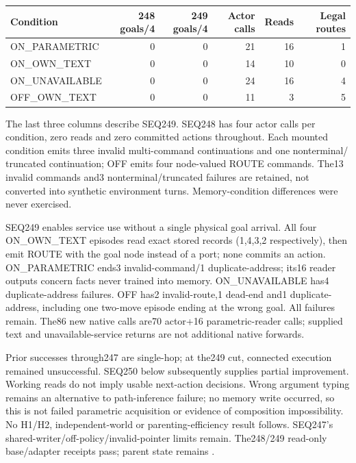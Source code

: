 \documentclass[11pt]{article}
\begin{document}
\begin{center}
\small
\begin{tabular}{lrrrrr}
\toprule
Condition & 248 goals/4 & 249 goals/4 & Actor calls & Reads & Legal routes \\
\midrule
ON\_PARAMETRIC & 0 & 0 & 21 & 16 & 1 \\
ON\_OWN\_TEXT & 0 & 0 & 14 & 10 & 0 \\
ON\_UNAVAILABLE & 0 & 0 & 24 & 16 & 4 \\
OFF\_OWN\_TEXT & 0 & 0 & 11 & 3 & 5 \\
\bottomrule
\end{tabular}
\end{center}
The last three columns describe SEQ249. SEQ248 has four actor calls per
condition, zero reads and zero committed actions throughout. Each mounted
condition emits three invalid multi-command continuations and one nonterminal/
truncated continuation; OFF emits four node-valued ROUTE commands. The13 invalid
commands and3 nonterminal/truncated failures are retained, not converted into
synthetic environment turns. Memory-condition differences were never exercised.

SEQ249 enables service use without a single physical goal arrival. All four
ON\_OWN\_TEXT episodes read exact stored records (1,4,3,2 respectively), then
emit ROUTE with the goal node instead of a port; none commits an action.
ON\_PARAMETRIC ends3 invalid-command/1 duplicate-address; its16 reader outputs
concern facts never trained into memory. ON\_UNAVAILABLE has4 duplicate-address
failures. OFF has2 invalid-route,1 dead-end and1 duplicate-address, including
one two-move episode ending at the wrong goal. All failures remain.
The86 new native calls are70 actor+16 parametric-reader calls; supplied text
and unavailable-service returns are not additional native forwards.

Prior successes through247 are single-hop; at the249 cut, connected execution
remained unsuccessful. SEQ250 below subsequently supplies partial improvement.
Working reads do not imply usable next-action decisions. Wrong argument typing
remains an alternative to path-inference failure; no memory write occurred, so
this is not failed parametric acquisition or evidence of composition impossibility.
No H1/H2, independent-world or parenting-efficiency result follows. SEQ247's
shared-writer/off-policy/invalid-pointer limits remain. The248/249 read-only
base/adapter receipts pass;
parent state remains
.
\end{document}
